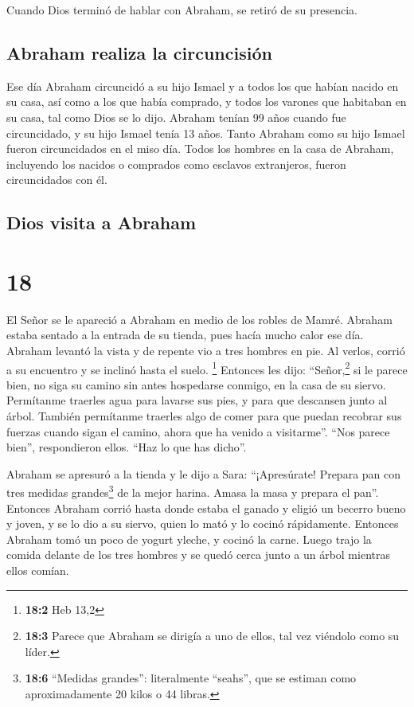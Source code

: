  Cuando Dios terminó de hablar con Abraham, se retiró de
su presencia.

\hypertarget{abraham-realiza-la-circuncisiuxf3n}{%
\subsection{Abraham realiza la
circuncisión}\label{abraham-realiza-la-circuncisiuxf3n}}

 Ese día Abraham circuncidó a su hijo Ismael y a todos
los que habían nacido en su casa, así como a los que había comprado, y
todos los varones que habitaban en su casa, tal como Dios se lo dijo.
 Abraham tenían 99 años cuando fue circuncidado,
 y su hijo Ismael tenía 13 años.  Tanto
Abraham como su hijo Ismael fueron circuncidados en el miso día.
 Todos los hombres en la casa de Abraham, incluyendo los
nacidos o comprados como esclavos extranjeros, fueron circuncidados con
él.

\hypertarget{dios-visita-a-abraham}{%
\subsection{Dios visita a Abraham}\label{dios-visita-a-abraham}}

\hypertarget{section-17}{%
\section{18}\label{section-17}}

 El Señor se le apareció a Abraham en medio de los robles
de Mamré. Abraham estaba sentado a la entrada de su tienda, pues hacía
mucho calor ese día.  Abraham levantó la vista y de
repente vio a tres hombres en pie. Al verlos, corrió a su encuentro y se
inclinó hasta el suelo. \footnote{\textbf{18:2} Heb 13,2} 
Entonces les dijo: ``Señor,\footnote{\textbf{18:3} Parece que Abraham se
  dirigía a uno de ellos, tal vez viéndolo como su líder.} si le parece
bien, no siga su camino sin antes hospedarse conmigo, en la casa de su
siervo.  Permítanme traerles agua para lavarse sus pies, y
para que descansen junto al árbol.  También permítanme
traerles algo de comer para que puedan recobrar sus fuerzas cuando sigan
el camino, ahora que ha venido a visitarme''. ``Nos parece bien'',
respondieron ellos. ``Haz lo que has dicho''.

 Abraham se apresuró a la tienda y le dijo a Sara:
``¡Apresúrate! Prepara pan con tres medidas grandes\footnote{\textbf{18:6}
  ``Medidas grandes'': literalmente ``seahs'', que se estiman como
  aproximadamente 20 kilos o 44 libras.} de la mejor harina. Amasa la
masa y prepara el pan''.  Entonces Abraham corrió hasta
donde estaba el ganado y eligió un becerro bueno y joven, y se lo dio a
su siervo, quien lo mató y lo cocinó rápidamente. 
Entonces Abraham tomó un poco de yogurt yleche, y cocinó la carne. Luego
trajo la comida delante de los tres hombres y se quedó cerca junto a un
árbol mientras ellos comían.

